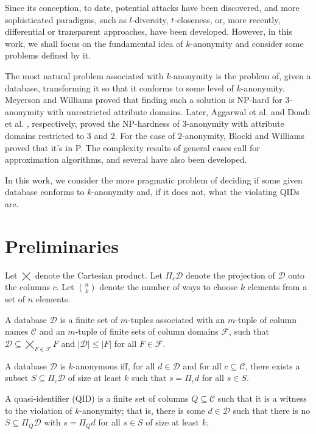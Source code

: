 \documentclass[12pt]{llncs}
\newcommand{\cC}{\mathcal{C}}
\newcommand{\cD}{\mathcal{D}}
\newcommand{\cF}{\mathcal{F}}
\newcommand{\Proj}[1]{\Pi_{#1}}
\begin{document}
Since its conception, to date, potential attacks have been discovered, and more sophisticated paradigms, such as $l$-diversity, $t$-closeness, or, more recently, differential or transparent approaches, have been developed. However, in this work, we shall focus on the fundamental idea of $k$-anonymity and consider some problems defined by it.

The most natural problem associated with $k$-anonymity is the problem of, given a database, transforming it so that it conforms to some level of $k$-anonymity. Meyerson and Williams \cite{Meyerson:2004} proved that finding such a solution is NP-hard for $3$-anonymity with unrestricted attribute domains. Later, Aggarwal et al. \cite{Aggarwal:2005} and Dondi et al. \cite{Dondi:2009}, respectively, proved the NP-hardness of $3$-anonymity with attribute domains restricted to $3$ and $2$. For the case of $2$-anonymity, Blocki and Williams \cite{Blocki:2010} proved that it's in P. The complexity results of general cases call for approximation algorithms, and several have also been developed.

In this work, we consider the more pragmatic problem of deciding if some given database conforms to $k$-anonymity and, if it does not, what the violating QIDs are.

\section{Preliminaries}

Let $\bigtimes$ denote the Cartesian product. Let $\Proj{c} \cD$ denote the projection of $\cD$ onto the columns $c$. Let $\binom{n}{k}$ denote the number of ways to choose $k$ elements from a set of $n$ elements.

\begin{definition}
A database $\cD$ is a finite set of $m$-tuples associated with an $m$-tuple of column names $\cC$ and an $m$-tuple of finite sets of column domains $\cF$, such that $\cD \subseteq \bigtimes_{F \in \cF} F$ and $|\cD| \leq |F|$ for all $F \in \cF$.
\end{definition}

\begin{definition}[$k$-anonymity]
A database $\cD$ is $k$-anonymous iff, for all $d \in \cD$ and for all $c \subseteq \cC$, there exists a subset $S \subseteq \Proj{c} \cD$ of size at least $k$ such that $s = \Proj{c} d$ for all $s \in S$.
\end{definition}

\begin{definition}
A quasi-identifier (QID) is a finite set of columns $Q \subseteq \cC$ such that it is a witness to the violation of $k$-anonymity; that is, there is some $d \in \cD$ such that there is no $S \subseteq \Proj{Q} \cD$ with $s = \Proj{Q} d$ for all $s \in S$ of size at least $k$.
\end{definition}
\end{document}
